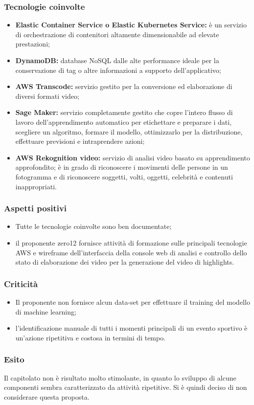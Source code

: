 \subsubsection{Tecnologie coinvolte}
	\begin{itemize}
		\item \textbf{Elastic Container Service o Elastic Kubernetes Service:} è un servizio di orchestrazione di contenitori altamente dimensionabile ad elevate
		prestazioni; 
		\item \textbf{DynamoDB:} database NoSQL dalle alte performance ideale per la conservazione di tag o altre informazioni a supporto dell'applicativo; 
		\item \textbf{AWS Transcode:} servizio gestito per la conversione ed elaborazione di diversi formati video; 
		\item \textbf{Sage Maker:} servizio completamente gestito che copre l'intero flusso di lavoro dell'apprendimento automatico per etichettare e preparare i
		dati, scegliere un algoritmo, formare il modello, ottimizzarlo per la distribuzione, effettuare previsioni e intraprendere azioni; 
		\item \textbf{AWS Rekognition video:} servizio di analisi video basato su apprendimento approfondito; è in grado di riconoscere i movimenti delle persone
		in un fotogramma e di riconoscere soggetti, volti, oggetti, celebrità e contenuti inappropriati. 
	\end{itemize}

\subsubsection{Aspetti positivi}
	\begin{itemize}
		\item Tutte le tecnologie coinvolte sono ben documentate; 
		\item il proponente zero12 fornisce attività di formazione sulle principali tecnologie AWS e wireframe dell’interfaccia della console web di analisi e controllo dello stato di elaborazione dei video per la generazione del video di highlights.
	\end{itemize}

\subsubsection{Criticità}
	\begin{itemize}
		\item Il proponente non fornisce alcun data-set per effettuare il training del modello di machine learning; 
		\item l'identificazione manuale di tutti i momenti principali di un evento sportivo è un'azione ripetitiva e costosa in termini di tempo. 
	\end{itemize}

\subsubsection{Esito}
Il capitolato non è risultato molto stimolante, in quanto lo sviluppo di alcune componenti sembra caratterizzato da attività ripetitive. Si è quindi deciso di non considerare questa proposta. 
